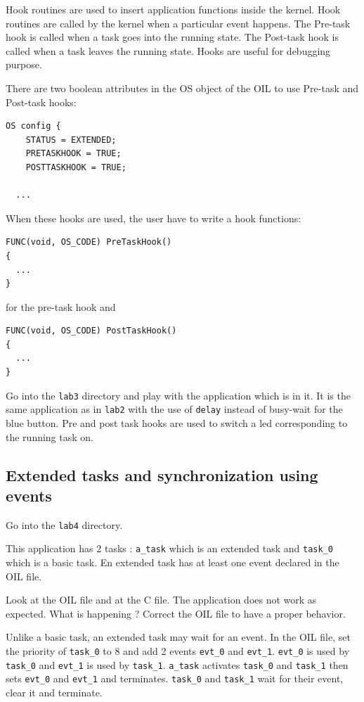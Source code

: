 \documentclass[11pt]{article}
\begin{document}
Hook routines are used to insert application functions inside the kernel. Hook routines are called by the kernel when a particular event happens. The Pre-task hook is called when a task goes into the running state. The Post-task hook is called when a task leaves the running state. Hooks are useful for debugging purpose.

There are two boolean attributes in the OS object of the OIL to use Pre-task and Post-task hooks:

\begin{lstlisting}[language=OIL]
  OS config {
    STATUS = EXTENDED;
    PRETASKHOOK = TRUE;
    POSTTASKHOOK = TRUE;
    
  ...
\end{lstlisting}

When these hooks are used, the user have to write a hook functions:

\begin{lstlisting}
FUNC(void, OS_CODE) PreTaskHook()
{
  ...
}
\end{lstlisting}

for the pre-task hook and

\begin{lstlisting}
FUNC(void, OS_CODE) PostTaskHook()
{
  ...
}
\end{lstlisting}


Go into the \texttt{lab3} directory and play with the application which is in it. It is the same application as in \lstinline{lab2} with the use of \lstinline{delay} instead of busy-wait for the blue button. Pre and post task hooks are used to switch a led corresponding to the running task on.

\subsection{Extended tasks and synchronization using events}

Go into the \lstinline{lab4} directory.

This application has 2 tasks : \lstinline{a_task} which is an extended task and \lstinline{task_0} which is a basic task. En extended task has at least one event declared in the OIL file.

Look at the OIL file and at the C file. The application does not work as expected. What is happening ? Correct the OIL file to have a proper behavior.


Unlike a basic task, an extended task may wait for an event. In the OIL file, set the priority of \texttt{task_0} to 8 and add 2 events \texttt{evt_0} and \texttt{evt_1}. \texttt{evt_0} is used by \texttt{task_0} and \texttt{evt_1} is used by \texttt{task_1}. \texttt{a_task} activates \texttt{task_0} and \texttt{task_1} then sets \texttt{evt_0} and \texttt{evt_1} and terminates. \texttt{task_0} and \texttt{task_1} wait for their event, clear it and terminate.
\end{document}
